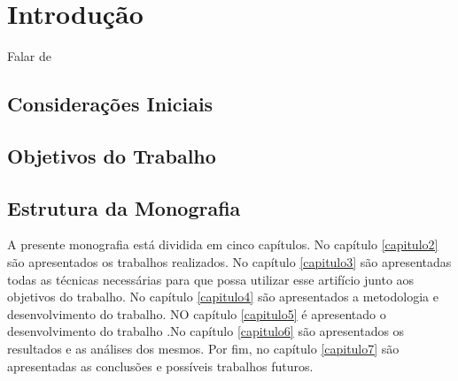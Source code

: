 
\chapter[Introdução]{Introdução}\label{capitulo1}

Falar de 

\section{Considerações Iniciais}

\section{Objetivos do Trabalho}

\section{Estrutura da Monografia}

A presente monografia está dividida em cinco capítulos. No capítulo \ref{capitulo2}  são apresentados os trabalhos realizados. No capítulo \ref{capitulo3} são apresentadas todas as técnicas necessárias para que possa utilizar esse artifício junto aos objetivos do trabalho. No capítulo \ref{capitulo4} são apresentados a metodologia e desenvolvimento do trabalho. NO capítulo \ref{capitulo5} é apresentado o desenvolvimento do trabalho .No capítulo \ref{capitulo6} são apresentados os resultados e as análises dos mesmos. Por fim, no capítulo \ref{capitulo7} são apresentadas as conclusões e possíveis trabalhos futuros.